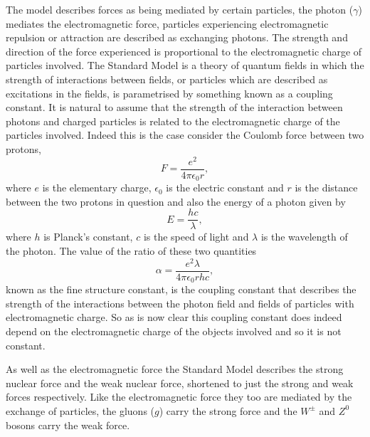 The model describes forces as being mediated by certain particles, the photon
($\gamma$) mediates the electromagnetic force, particles experiencing
electromagnetic repulsion or attraction are described as exchanging photons. The
strength and direction of the force experienced is proportional to the
electromagnetic charge of particles involved. The Standard Model is a theory of
quantum fields in which the strength of interactions between fields, or
particles which are described as excitations in the fields, is parametrised by
something known as a coupling constant. It is natural to assume that the
strength of the interaction between photons and charged particles is related to
the electromagnetic charge of the particles involved. Indeed this is the case
consider the Coulomb force between two protons,
\begin{equation} F = \frac{e^2}{4\pi\epsilon_0r},
\end{equation} where $e$ is the elementary charge, $\epsilon_0$ is the electric
constant and $r$ is the distance between the two protons in question and also
the energy of a photon given by
\begin{equation} E = \frac{hc}{\lambda},
\end{equation} where $h$ is Planck's constant, $c$ is the speed of light and
$\lambda$ is the wavelength of the photon. The value of the ratio of these two
quantities
\begin{equation}
  \label{eq:fine-structure} \alpha = \frac{e^{2}\lambda}{4\pi\epsilon_{0}rhc},
\end{equation} known as the fine structure constant, is the coupling constant
that describes the strength of the interactions between the photon field and
fields of particles with electromagnetic charge. So as is now clear this
coupling constant does indeed depend on the electromagnetic charge of the
objects involved and so it is not constant.

As well as the electromagnetic force the Standard Model describes the strong
nuclear force and the weak nuclear force, shortened to just the strong and weak
forces respectively. Like the electromagnetic force they too are mediated by the
exchange of particles, the gluons ($g$) carry the strong force and the $W^\pm$
and $Z^0$ bosons carry the weak force.

